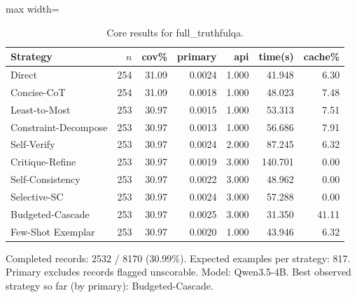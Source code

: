 \documentclass[10pt,twocolumn]{article}
\begin{document}
\begin{table}[t]
\centering
\caption{Core results for full\_truthfulqa.}
\label{tab:full_truthfulqa_core}
\begin{adjustbox}{max width=\textwidth}
\begin{tabular}{lrrrrrr}
\toprule
Strategy & $n$ & cov\% & primary & api & time(s) & cache\% \\
\midrule
Direct & 254 & 31.09 & 0.0024 & 1.000 & 41.948 & 6.30 \\
Concise-CoT & 254 & 31.09 & 0.0018 & 1.000 & 48.023 & 7.48 \\
Least-to-Most & 253 & 30.97 & 0.0015 & 1.000 & 53.313 & 7.51 \\
Constraint-Decompose & 253 & 30.97 & 0.0013 & 1.000 & 56.686 & 7.91 \\
Self-Verify & 253 & 30.97 & 0.0024 & 2.000 & 87.245 & 6.32 \\
Critique-Refine & 253 & 30.97 & 0.0019 & 3.000 & 140.701 & 0.00 \\
Self-Consistency & 253 & 30.97 & 0.0022 & 3.000 & 48.962 & 0.00 \\
Selective-SC & 253 & 30.97 & 0.0024 & 3.000 & 57.288 & 0.00 \\
Budgeted-Cascade & 253 & 30.97 & 0.0025 & 3.000 & 31.350 & 41.11 \\
Few-Shot Exemplar & 253 & 30.97 & 0.0020 & 1.000 & 43.946 & 6.32 \\
\bottomrule
\end{tabular}
\end{adjustbox}
\vspace{2pt}\parbox{0.98\textwidth}{\footnotesize Completed records: 2532 / 8170 (30.99\%). Expected examples per strategy: 817. Primary excludes records flagged unscorable. Model: Qwen3.5-4B. Best observed strategy so far (by primary): Budgeted-Cascade.}
\end{table}
\end{document}
